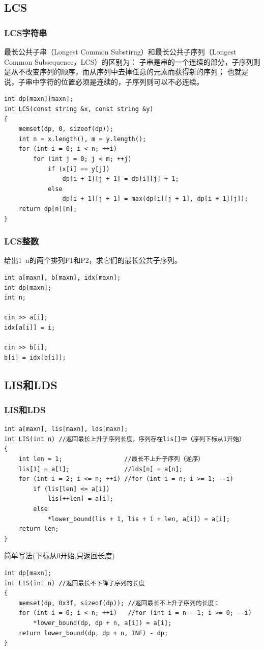 \documentclass[twoside]{article}
\begin{document}
\subsection{LCS}
\subsubsection{LCS字符串}
最长公共子串（Longest Common Substirng）和最长公共子序列（Longest Common Subsequence，LCS）的区别为：
子串是串的一个连续的部分，子序列则是从不改变序列的顺序，而从序列中去掉任意的元素而获得新的序列；
也就是说，子串中字符的位置必须是连续的，子序列则可以不必连续。
\begin{lstlisting}
int dp[maxn][maxn];
int LCS(const string &x, const string &y)
{
    memset(dp, 0, sizeof(dp));
    int n = x.length(), m = y.length();
    for (int i = 0; i < n; ++i)
        for (int j = 0; j < m; ++j)
            if (x[i] == y[j])
                dp[i + 1][j + 1] = dp[i][j] + 1;
            else
                dp[i + 1][j + 1] = max(dp[i][j + 1], dp[i + 1][j]);
    return dp[n][m];
}
\end{lstlisting}
\subsubsection{LCS整数}
给出1~n的两个排列P1和P2，求它们的最长公共子序列。
\begin{lstlisting}
int a[maxn], b[maxn], idx[maxn];
int dp[maxn];
int n;

cin >> a[i];
idx[a[i]] = i;

cin >> b[i];
b[i] = idx[b[i]];
\end{lstlisting}
\subsection{LIS和LDS}
\subsubsection{LIS和LDS}
\begin{lstlisting}
int a[maxn], lis[maxn], lds[maxn];
int LIS(int n) //返回最长上升子序列长度，序列存在lis[]中（序列下标从1开始）
{
    int len = 1;                 //最长不上升子序列（逆序）
    lis[1] = a[1];               //lds[n] = a[n];
    for (int i = 2; i <= n; ++i) //for (int i = n; i >= 1; --i)
        if (lis[len] <= a[i])
            lis[++len] = a[i];
        else
            *lower_bound(lis + 1, lis + 1 + len, a[i]) = a[i];
    return len;
}
\end{lstlisting}
简单写法(下标从0开始,只返回长度)
\begin{lstlisting}
int dp[maxn];
int LIS(int n) //返回最长不下降子序列的长度
{
    memset(dp, 0x3f, sizeof(dp)); //返回最长不上升子序列的长度：
    for (int i = 0; i < n; ++i)   //for (int i = n - 1; i >= 0; --i)
        *lower_bound(dp, dp + n, a[i]) = a[i];
    return lower_bound(dp, dp + n, INF) - dp;
}
\end{lstlisting}
\end{document}
